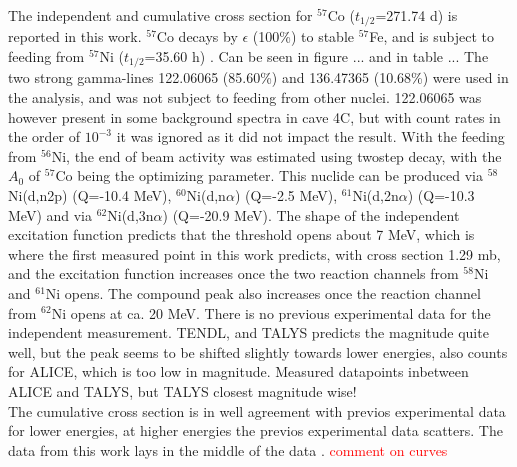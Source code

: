 \subsubsection{}
The independent and cumulative cross section for $^{57}$Co ($t_{1/2}$=271.74 d) is reported in this work. $^{57}$Co decays by $\epsilon$ (100\%) to stable $^{57}$Fe, and is subject to feeding from $^{57}$Ni ($t_{1/2}$=35.60 h) \cite{Bhat1998}. Can be seen in figure ... and in table ... The two strong gamma-lines 122.06065 (85.60\%) and 136.47365 (10.68\%) were used in the analysis, and was not subject to feeding from other nuclei. 122.06065 was however present in some background spectra in cave 4C, but with count rates in the order of $10^{-3}$ it was ignored as it did not impact the result. With the feeding from $^{56}$Ni, the end of beam activity was estimated using twostep decay, with the $A_0$ of $^{57}$Co being the optimizing parameter. This nuclide can be produced via $^{58}$Ni(d,n2p) (Q=-10.4 MeV), $^{60}$Ni(d,n$\alpha$) (Q=-2.5 MeV), $^{61}$Ni(d,2n$\alpha$) (Q=-10.3 MeV) and via $^{62}$Ni(d,3n$\alpha$) (Q=-20.9 MeV). The shape of the independent excitation function predicts that the threshold opens about 7 MeV, which is where the first measured point in this work predicts, with cross section 1.29 mb, and the excitation function increases once the two reaction channels from $^{58}$Ni and $^{61}$Ni opens. The compound peak also increases once the reaction channel from $^{62}$Ni opens at ca. 20 MeV. There is no previous experimental data for the independent measurement. TENDL, and TALYS predicts the magnitude quite well, but the peak seems to be shifted slightly towards lower energies, also counts for ALICE, which is too low in magnitude. Measured datapoints inbetween ALICE and TALYS, but TALYS closest magnitude wise!\\

\noindent 
The cumulative cross section is in well agreement with previos experimental data for lower energies, at higher energies the previos experimental data scatters. The data from this work lays in the middle of the data \cite{Usman2016, Hermanne2013, Amjed2013, Avrigeanu2016, Takacs1997, Zweit1991, Takacs2007, Ochiai2007}. \textcolor{red}{comment on curves}




